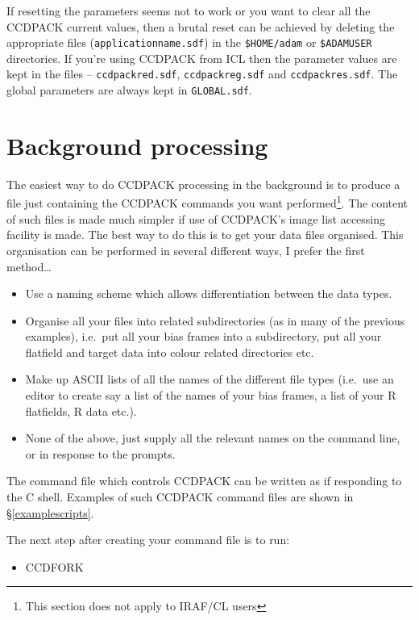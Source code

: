 \documentclass[twoside,11pt]{article}
\newcommand{\hyperref}[4]{#2\ref{#4}#3}
\newcommand{\htmlref}[2]{#1}
\newcommand{\latexhtml}[2]{#1}
\newcommand{\xlabel}[1]{}
\renewcommand{\_}{\texttt{\symbol{95}}}
\newcommand{\ttsize}{\latexhtml{\small}{}}
\newcommand{\text}[1]{{\ttsize \tt #1}}
\newcommand{\xroutine}[1]{\htmlref{{\sc #1}}{#1}}
\begin{document}
If resetting the parameters seems not to work or you want to clear all
the CCDPACK current values, then a brutal reset can be achieved
by deleting the appropriate files (\text{application\_name.sdf}) in the
\text{\$HOME/adam} or \text{\$ADAM\_USER} directories. If you're using
CCDPACK from ICL then the parameter values are kept in the
files -- \text{ccdpack\_red.sdf}, \text{ccdpack\_reg.sdf} and
\text{ccdpack\_res.sdf}. The global parameters are always kept in
\text{GLOBAL.sdf}.

\section{\xlabel{backgroundprocessing}Background processing
         \label{backgroundprocessing}}

The easiest way to do CCDPACK processing in the background is to
produce a file just containing the CCDPACK commands you want
performed\footnote{This section does not apply to IRAF/CL users}. The
content of such files is made much simpler if use of CCDPACK's image
list accessing facility is made. The best way to do this is to get
your data files organised. This organisation can be performed in
several different ways, I prefer the first method\ldots

\begin{itemize}
\item Use a naming scheme which allows differentiation between the data
types.

\item Organise all your files into related subdirectories (as in many of
the previous examples), i.e.\ put all your bias frames into a
subdirectory, put all your flatfield and target data into colour related
directories etc.

\item Make up ASCII lists of all the names of the different file types
(i.e.\ use an editor to create say a list of the names of your bias
frames, a list of your R flatfields, R data etc.).


\item None of the above, just supply all the relevant names on the
command line, or in response to the prompts.
\end{itemize}

The command file which controls CCDPACK can be written as if
responding to the C shell. Examples of such CCDPACK command files
are shown \hyperref{elsewhere}{in \S}{}{examplescripts}.

The next step after creating your command file is to run:
\begin{itemize}
\item \xroutine{CCDFORK}
\end{itemize}
\end{document}
